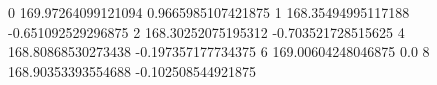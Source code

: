 0 169.97264099121094 0.9665985107421875
1 168.35494995117188 -0.651092529296875
2 168.30252075195312 -0.703521728515625
4 168.80868530273438 -0.197357177734375
6 169.00604248046875 0.0
8 168.90353393554688 -0.102508544921875
